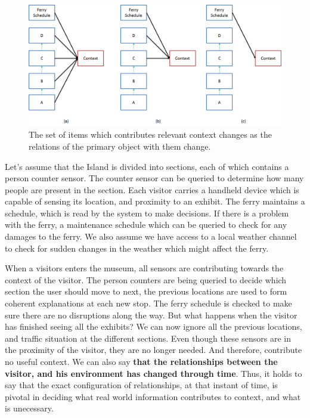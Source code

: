 \begin{figure}[t]
\centering
\includegraphics[width=\textwidth]{media/chapter2/changes.png}
\caption{The set of items which contributes relevant context changes as the relations of the primary object with them change.}
\label{fig:turkey}
\end{figure}

Let's assume that the Island is divided into sections, each of which contains a person counter sensor. The counter sensor can be queried to determine how many people are present in the section. Each visitor carries a handheld device which is capable of sensing its location, and proximity to an exhibit. The ferry maintains a schedule, which is read by the system to make decisions. If there is a problem with the ferry, a maintenance schedule which can be queried to check for any damages to the ferry. We also assume we have access to a local weather channel to check for sudden changes in the weather which might affect the ferry.

When a visitors enters the museum, all sensors are contributing towards the context of the visitor. The person counters are being queried to decide which section the user should move to next, the previous locations are used to form coherent explanations at each new stop. The ferry schedule is checked to make sure there are no disruptions along the way. But what happens when the visitor has finished seeing all the exhibits? We can now ignore all the previous locations, and traffic situation at the different sections. Even though these sensors are in the proximity of the visitor, they are no longer needed. And therefore, contribute no useful context. We can also say \textbf{that the relationships between the visitor, and his environment has changed through time}. Thus, it holds to say that the exact configuration of relationships, at that instant of time, is pivotal in deciding what real world information contributes to context, and what is unecessary.


